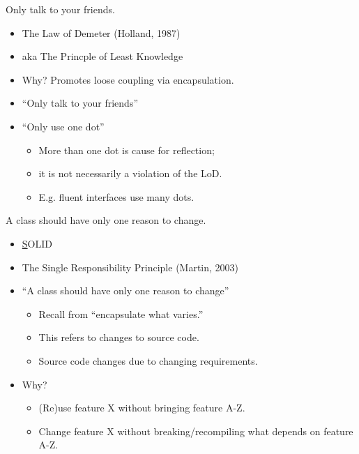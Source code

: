 \documentclass{beamer}
\begin{document}
\begin{frame}{Only talk to your friends.}
    \begin{itemize}
        \item The Law of Demeter (Holland, 1987)
        \item aka The Princple of Least Knowledge
        \item Why? Promotes loose coupling via encapsulation.
        \item ``Only talk to your friends''
        \item ``Only use one dot'' 
            \begin{itemize}
                \item More than one dot is cause for reflection; 
                \item it is not necessarily a violation of the LoD.
                \item E.g. fluent interfaces use many dots.
            \end{itemize}
    \end{itemize}
\end{frame}

\begin{frame}{A class should have only one reason to change.}
    \begin{itemize}
        \item \underline{S}OLID %
        \item The Single Responsibility Principle (Martin, 2003)
        \item ``A class should have only one reason to change''
        \begin{itemize}
            \item Recall from ``encapsulate what varies.''
            \item This refers to changes to source code.
            \item Source code changes due to changing requirements.
        \end{itemize}
    \item Why? 
        \begin{itemize}
            \item (Re)use feature X without bringing feature A-Z.
            \item Change feature X without breaking/recompiling what depends on feature A-Z.
        \end{itemize}
    \end{itemize}
\end{frame}
\end{document}
